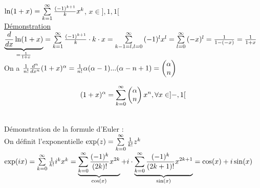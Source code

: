\documentclass[12pt,a4paper]{article}
\begin{document}
{$\ln(1+x) = \sum\limits_{k=1}^{\infty}{\frac{(-1)^{k+1}}{k}x^k}$, $x\in ],1,1[$\\
\underline{Démonstration}\\
$\underbrace{\frac{d}{dx}\ln(1+x)}_{=\frac{1}{1+x}} = \sum\limits_{k=1}^{\infty}{\frac{(-1)^{k+1}}{k}\cdot k\cdot x} =
 \sum\limits_{k-1=l, l=0}^{\infty}{(-1)^lx^l} = \sum\limits_{l=0}^{\infty}{(-x)^l}= \frac{1}{1-(-x)} = \frac{1}{1+x}$
\\
On a $\frac{1}{n!}\frac{d^n}{dx^n} (1+x)^\alpha = \frac{1}{n!}\alpha(\alpha-1)...(\alpha-n+1) = \begin{pmatrix} \alpha \\ n \end{pmatrix}$
\begin{boite}
	\begin{equation}
		(1+x)^\alpha = \sum\limits_{k=0}^{\infty}{\begin{pmatrix} \alpha \\ n \end{pmatrix}x^n}, \forall x \in ]-,1[
	\end{equation}
\end{boite}
\\
Démonstration de la formule d'Euler :\\
On définit l'exponentielle $\exp(z) = \sum\limits_{k=0}^{\infty}{\frac{1}{k!}z^k}$\\
$\exp(ix)= \sum\limits_{k=0}^{\infty}{\frac{1}{k!}i^kx^k} = \underbrace{\sum\limits_{k=0}^{\infty}{\frac{(-1)^k}{(2k)!}x^{2k}}}_{\cos(x)} + i\cdot \underbrace{\sum\limits_{k=0}^{\infty}{\frac{(-1)^k}{(2k+1)!}x^{2k+1}}}_{\sin(x)} = \cos(x) + i \sin(x)$
}
\end{document}
